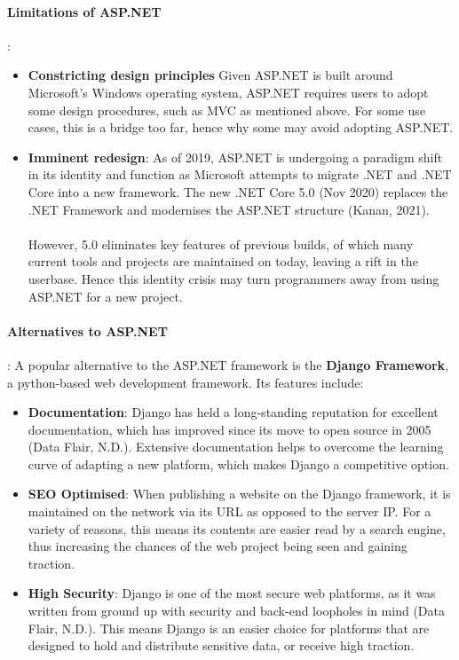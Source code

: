 \documentclass[a4paper, 11pt]{report}
\begin{document}
	\paragraph{Limitations of ASP.NET}:

	\begin{itemize}
	    \item \textbf{Constricting design principles} Given ASP.NET is built around Microsoft's Windows operating system, ASP.NET requires users to adopt some design procedures, such as MVC as mentioned above. For some use cases, this is a bridge too far, hence why some may avoid adopting ASP.NET.

	    \item \textbf{Imminent redesign}: As of 2019, ASP.NET is undergoing a paradigm shift in its identity and function as Microsoft attempts to migrate .NET and .NET Core into a new framework. The new .NET Core 5.0 (Nov 2020) replaces the .NET Framework and modernises the ASP.NET structure (Kanan, 2021).
	    \\
	    \\However, 5.0 eliminates key features of previous builds, of which many current tools and projects are maintained on today, leaving a rift in the userbase. Hence this identity crisis may turn programmers away from using ASP.NET for a new project.
	\end{itemize}

	\paragraph{Alternatives to ASP.NET}: A popular alternative to the ASP.NET framework is the \textbf{Django Framework}, a python-based web development framework. Its features include:

	\begin{itemize}
	    \item \textbf{Documentation}: Django has held a long-standing reputation for excellent documentation, which has improved since its move to open source in 2005 (Data Flair, N.D.). Extensive documentation helps to overcome the learning curve of adapting a new platform, which makes Django a competitive option.

	    \item \textbf{SEO Optimised}: When publishing a website on the Django framework, it is maintained on the network via its URL as opposed to the server IP. For a variety of reasons, this means its contents are easier read by a search engine, thus increasing the chances of the web project being seen and gaining traction.

	    \item \textbf{High Security}: Django is one of the most secure web platforms, as it was written from ground up with security and back-end loopholes in mind (Data Flair, N.D.). This means Django is an easier choice for platforms that are designed to hold and distribute sensitive data, or receive high traction.
	\end{itemize}
\end{document}
